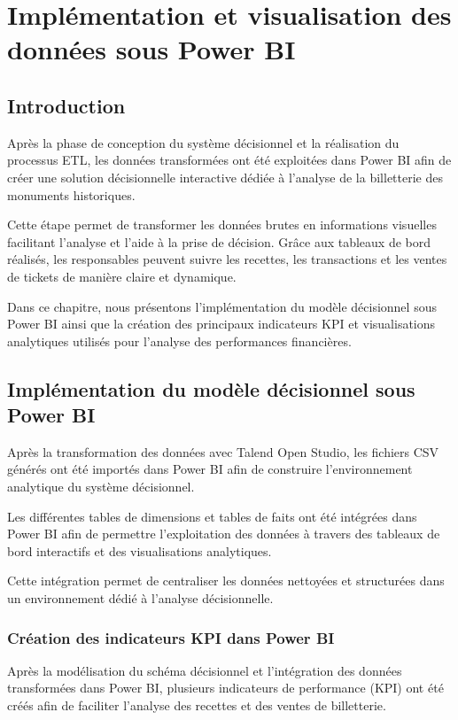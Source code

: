 \documentclass[12pt,a4paper]{report}
\begin{document}
\chapter{Implémentation et visualisation des données sous Power BI}

\section{Introduction}

Après la phase de conception du système décisionnel et la réalisation du processus ETL, les données transformées ont été exploitées dans Power BI afin de créer une solution décisionnelle interactive dédiée à l’analyse de la billetterie des monuments historiques.

Cette étape permet de transformer les données brutes en informations visuelles facilitant l’analyse et l’aide à la prise de décision. Grâce aux tableaux de bord réalisés, les responsables peuvent suivre les recettes, les transactions et les ventes de tickets de manière claire et dynamique.

Dans ce chapitre, nous présentons l’implémentation du modèle décisionnel sous Power BI ainsi que la création des principaux indicateurs KPI et visualisations analytiques utilisés pour l’analyse des performances financières.

\section{Implémentation du modèle décisionnel sous Power BI}

Après la transformation des données avec Talend Open Studio, les fichiers CSV générés ont été importés dans Power BI afin de construire l’environnement analytique du système décisionnel.

Les différentes tables de dimensions et tables de faits ont été intégrées dans Power BI afin de permettre l’exploitation des données à travers des tableaux de bord interactifs et des visualisations analytiques.

Cette intégration permet de centraliser les données nettoyées et structurées dans un environnement dédié à l’analyse décisionnelle.

\subsection{Création des indicateurs KPI dans Power BI}

Après la modélisation du schéma décisionnel et l’intégration des données transformées dans Power BI, plusieurs indicateurs de performance (KPI) ont été créés afin de faciliter l’analyse des recettes et des ventes de billetterie.
\end{document}
